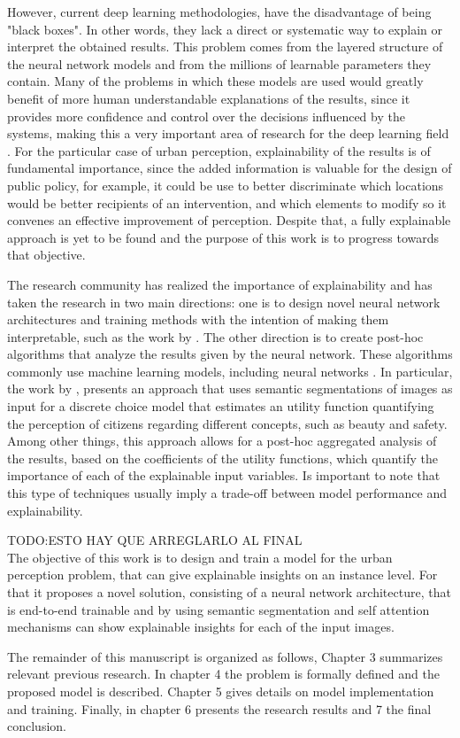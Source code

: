 However, current deep learning methodologies, have the disadvantage of being "black boxes". In other
words, they lack a direct or systematic way to explain or interpret the obtained results. This problem
comes from the layered structure of the neural network models and from the millions of learnable parameters
they contain. Many of the problems in which these models are used would greatly benefit of more
human understandable explanations of the results, since it provides more confidence and control
over the decisions influenced by the systems, making this a very important area of
research for the deep learning field \cite{adadi_xai, ras_explanation}. For the particular case of urban perception,
explainability of the results is of fundamental importance, since the added information is valuable
for the design of public policy, for example, it could be use to better discriminate which locations
would be better recipients of an intervention, and which elements to modify so it convenes
an effective improvement of perception. Despite that, a fully explainable approach is yet to be found
and the purpose of this work is to progress towards that objective.

The research community has realized the importance of explainability
and has taken the research in two main directions: one is to design novel
neural network architectures and training methods with the intention of making them interpretable,
such as the work by . The other
direction is to  create post-hoc algorithms \cite{adadi_xai} that analyze the results given by the
neural network. These algorithms commonly use machine learning models, including neural networks \cite{kim_ace}.
In particular, the work by , presents an approach that uses semantic segmentations of  images
\cite{segnet} as input for a discrete choice model that estimates an utility function quantifying the
perception of citizens regarding different concepts, such as beauty and safety.
Among other things, this approach allows for a post-hoc aggregated analysis of the results, based
on the coefficients of the utility functions, which quantify the importance of each of the explainable input variables.
Is important to note that this type of techniques usually imply a trade-off between model performance and explainability.

TODO:ESTO HAY QUE ARREGLARLO AL FINAL \\
The objective of this work is to design and train a model for the urban perception problem,
that can give explainable insights on an instance level. For that it proposes a novel solution,
consisting of a neural network architecture, that is end-to-end trainable and by using semantic
segmentation \cite{pspnet} and self attention mechanisms \cite{vaswani_attention} can show
explainable insights for each of the input images.

The remainder of this manuscript is organized as follows, Chapter 3 summarizes relevant previous research. In chapter 4
the problem is formally defined and the proposed model is described. Chapter 5 gives
details on model implementation and training. Finally, in chapter 6 presents the research results
and 7 the final conclusion.
